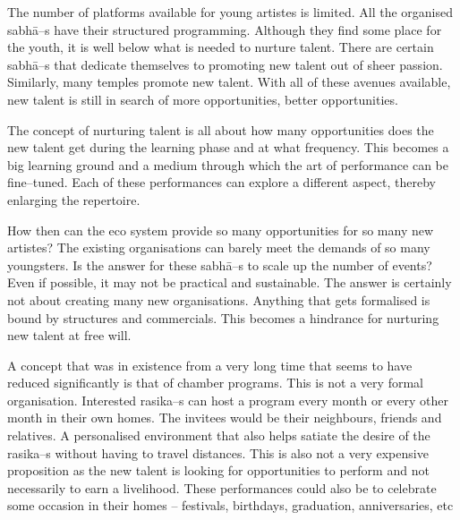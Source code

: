 \begin{itemize}
\begin{myquote}
The number of platforms available for young artistes is limited. All the organised sabhā–s have their structured programming. Although they find some place for the youth, it is well below what is needed to nurture talent. There are certain sabhā–s that dedicate themselves to promoting new talent out of sheer passion. Similarly, many temples promote new talent. With all of these avenues available, new talent is still in search of more opportunities, better opportunities.
\end{myquote}

\begin{myquote}
The concept of nurturing talent is all about how many opportunities does the new talent get during the learning phase and at what frequency. This becomes a big learning ground and a medium through which the art of performance can be fine–tuned. Each of these performances can explore a different aspect, thereby enlarging the repertoire.
\end{myquote}

\begin{myquote}
How then can the eco system provide so many opportunities for so many new artistes? The existing organisations can barely meet the demands of so many youngsters. Is the answer for these sabhā–s to scale up the number of events? Even if possible, it may not be practical and sustainable. The answer is certainly not about creating many new organisations. Anything that gets formalised is bound by structures and commercials. This becomes a hindrance for nurturing new talent at free will.
\end{myquote}

\begin{myquote}
A concept that was in existence from a very long time that seems to have reduced significantly is that of chamber programs. This is not a very formal organisation. Interested rasika–s can host a program every month or every other month in their own homes. The invitees would be their neighbours, friends and relatives. A personalised environment that also helps satiate the desire of the rasika–s without having to travel distances. This is also not a very expensive proposition as the new talent is looking for opportunities to perform and not necessarily to earn a livelihood. These performances could also be to celebrate some occasion in their homes – festivals, birthdays, graduation, anniversaries, etc
\end{myquote}


\end{itemize}
